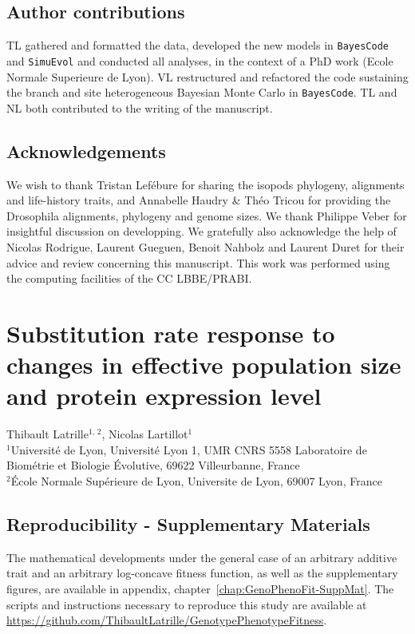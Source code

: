 \documentclass[a4paper,oneside,nobind]{thesis}
\begin{document}
\section{Author contributions}
TL gathered and formatted the data, developed the new models in \texttt{BayesCode} and \texttt{SimuEvol} and conducted all analyses, in the context of a PhD work (Ecole Normale Superieure de Lyon).
VL restructured and refactored the code sustaining the branch and site heterogeneous Bayesian Monte Carlo in \texttt{BayesCode}.
TL and NL both contributed to the writing of the manuscript.

\section{Acknowledgements}
We wish to thank Tristan Lefébure for sharing the isopods phylogeny, alignments and life-history traits, and Annabelle Haudry \& Théo Tricou for providing the Drosophila alignments, phylogeny and genome sizes.
We thank Philippe Veber for insightful discussion on developping.
We gratefully also acknowledge the help of Nicolas Rodrigue, Laurent Gueguen, Benoit Nahbolz and Laurent Duret for their advice and review concerning this manuscript.
This work was performed using the computing facilities of the CC LBBE/PRABI.

\thispagestyle{empty}
\chapter[Substitution rate susceptibility]{Substitution rate response to changes in effective population size and protein expression level}
\label{chap:GenoPhenoFit}

\begin{center}
	\Large Thibault Latrille$^{\text{1, 2}}$, Nicolas Lartillot$^{\text{1}}$\\
	\vspace{0.5cm}
	\normalsize
	$^{\text{1}}$Université de Lyon, Université Lyon 1, UMR CNRS 5558 Laboratoire de Biométrie et Biologie Évolutive, 69622 Villeurbanne, France\\
	$^{\text{2}}$École Normale Supérieure de Lyon, Universite de Lyon, 69007 Lyon, France\\
\end{center}

{\hypersetup{linkcolor=GREYDARK}\minitoc}



\section{Reproducibility - Supplementary Materials}
The mathematical developments under the general case of an arbitrary additive trait and an arbitrary log-concave fitness function, as well as the supplementary figures, are available in appendix, chapter~\ref{chap:GenoPhenoFit-SuppMat}.
The scripts and instructions necessary to reproduce this study are available at \url{https://github.com/ThibaultLatrille/GenotypePhenotypeFitness}.
\end{document}
